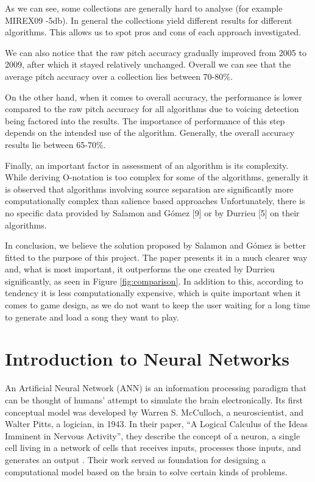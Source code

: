 As we can see, some collections are generally hard to analyse (for example MIREX09 -5db). In general the collections yield different results for different algorithms. This allows us to spot pros and cons of each approach investigated.

We can also notice that the raw pitch accuracy gradually improved from 2005 to 2009, after which it stayed relatively unchanged. Overall we can see that the average pitch accuracy over a collection lies between 70-80\%.

On the other hand, when it comes to overall accuracy, the performance is lower compared to the raw pitch accuracy for all algorithms due to voicing detection being factored into the results. The importance of performance of this step depends on the intended use of the algorithm. Generally, the overall accuracy results lie between 65-70\%.

Finally, an important factor in assessment of an algorithm is its complexity. While deriving O-notation is too complex for some of the algorithms, generally it is observed that algorithms involving source separation are significantly more computationally complex than salience based approaches Unfortunately, there is no specific data provided by Salamon and G\'{o}mez [9] or by Durrieu [5] on their algorithms.

In conclusion, we believe the solution proposed by Salamon and G\'{o}mez is better fitted to the purpose of this project. The paper presents it in a much clearer way and, what is most important, it outperforms the one created by Durrieu significantly, as seen in Figure \ref{fig:comparison}. In addition to this, according to tendency it is less computationally expensive, which is quite important when it comes to game design, as we do not want to keep the user waiting for a long time to generate and load a song they want to play.

\vspace{20pt}


\section{Introduction to Neural Networks}

An Artificial Neural Network (ANN) is an information processing paradigm that can be thought of humans' attempt to simulate the brain electronically. Its first conceptual model was developed by Warren S. McCulloch, a neuroscientist, and Walter Pitts, a logician, in 1943. In their paper, ``A Logical Calculus of the Ideas Imminent in Nervous Activity'', they describe the concept of a neuron, a single cell living in a network of cells that receives inputs, processes those inputs, and generates an output \cite{firstNN}. Their work served as foundation for designing a computational model based on the brain to solve certain kinds of problems.

